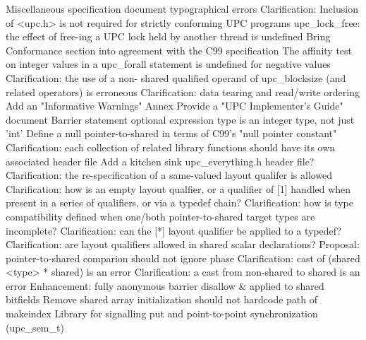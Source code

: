 {      \or %
        Miscellaneous specification document typographical errors
      \or %
        Clarification: Inclusion of <upc.h> is not required for strictly conforming UPC programs
      \or %
        upc\_lock\_free: the effect of free-ing a UPC lock held by another thread is undefined
      \or %
        Bring Conformance section into agreement with the C99 specification
      \or %
        The affinity test on integer values in a upc\_forall statement is undefined for negative values
      \or %
        Clarification: the use of a non- shared qualified operand of upc\_blocksize (and related operators) is erroneous
      \or %
        Clarification: data tearing and read/write ordering
      \or %
        Add an "Informative Warnings" Annex
      \or %
        Provide a "UPC Implementer's Guide" document
      \or %
        Barrier statement optional expression type is an integer type, not just 'int'
      \or %
        Define a null pointer-to-shared in terms of C99's "null pointer constant"
      \or %
        Clarification: each collection of related library functions should have its own associated header file
      \or %
        Add a kitchen sink upc\_everything.h header file?
      \or %
        Clarification: the re-specification of a same-valued layout qualifer is allowed
      \or %
        Clarification: how is an empty layout qualfier, or a qualifier of [1] handled when present in a series of qualifiers, or via a typedef chain?
      \or %
        Clarification: how is type compatibility defined when one/both pointer-to-shared target types are incomplete?
      \or %
        Clarification: can the [*] layout qualifier be applied to a typedef?
      \or %
        Clarification: are layout qualifiers allowed in shared scalar declarations?
      \or %
        Proposal: pointer-to-shared comparion should not ignore phase
      \or %
        Clarification: cast of (shared <type> * shared) is an error
      \or %
        Clarification: a cast from non-shared to shared is an error
      \or %
        Enhancement: fully anonymous barrier
      \or %
        disallow & applied to shared bitfields
      \or %
        Remove shared array initialization
      \or %
        should not hardcode path of makeindex
      \or %
        Library for signalling put and point-to-point synchronization (upc\_sem\_t)
}
